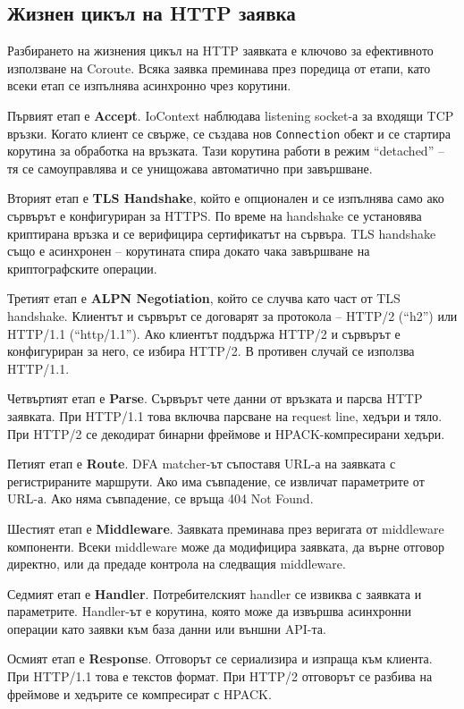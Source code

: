 \subsection{Жизнен цикъл на HTTP заявка}

Разбирането на жизнения цикъл на HTTP заявката е ключово за ефективното използване на Coroute. Всяка заявка преминава през поредица от етапи, като всеки етап се изпълнява асинхронно чрез корутини.

Първият етап е \textbf{Accept}. IoContext наблюдава listening socket-а за входящи TCP връзки. Когато клиент се свърже, се създава нов \texttt{Connection} обект и се стартира корутина за обработка на връзката. Тази корутина работи в режим ``detached'' -- тя се самоуправлява и се унищожава автоматично при завършване.

Вторият етап е \textbf{TLS Handshake}, който е опционален и се изпълнява само ако сървърът е конфигуриран за HTTPS. По време на handshake се установява криптирана връзка и се верифицира сертификатът на сървъра. TLS handshake също е асинхронен -- корутината спира докато чака завършване на криптографските операции.

Третият етап е \textbf{ALPN Negotiation}, който се случва като част от TLS handshake. Клиентът и сървърът се договарят за протокола -- HTTP/2 (``h2'') или HTTP/1.1 (``http/1.1''). Ако клиентът поддържа HTTP/2 и сървърът е конфигуриран за него, се избира HTTP/2. В противен случай се използва HTTP/1.1.

Четвъртият етап е \textbf{Parse}. Сървърът чете данни от връзката и парсва HTTP заявката. При HTTP/1.1 това включва парсване на request line, хедъри и тяло. При HTTP/2 се декодират бинарни фреймове и HPACK-компресирани хедъри.

Петият етап е \textbf{Route}. DFA matcher-ът съпоставя URL-а на заявката с регистрираните маршрути. Ако има съвпадение, се извличат параметрите от URL-а. Ако няма съвпадение, се връща 404 Not Found.

Шестият етап е \textbf{Middleware}. Заявката преминава през веригата от middleware компоненти. Всеки middleware може да модифицира заявката, да върне отговор директно, или да предаде контрола на следващия middleware.

Седмият етап е \textbf{Handler}. Потребителският handler се извиква с заявката и параметрите. Handler-ът е корутина, която може да извършва асинхронни операции като заявки към база данни или външни API-та.

Осмият етап е \textbf{Response}. Отговорът се сериализира и изпраща към клиента. При HTTP/1.1 това е текстов формат. При HTTP/2 отговорът се разбива на фреймове и хедърите се компресират с HPACK.

